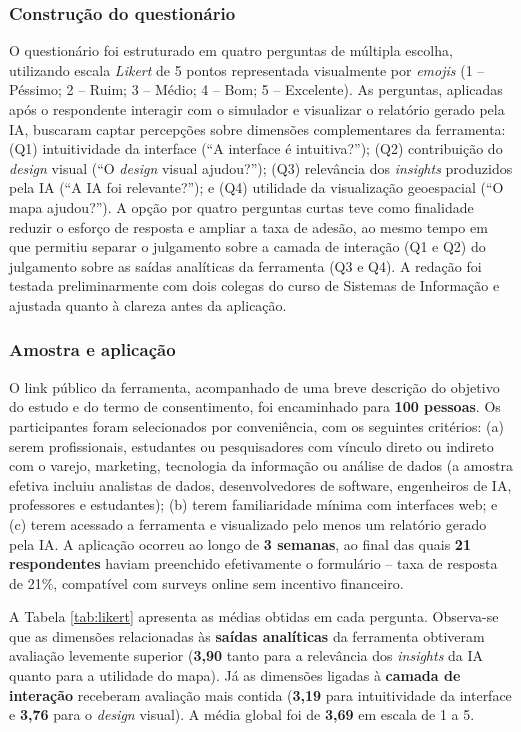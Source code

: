 \subsubsection{\esp Construção do questionário}

O questionário foi estruturado em quatro perguntas de múltipla escolha, utilizando escala \textit{Likert} de 5 pontos representada visualmente por \textit{emojis} (1 -- Péssimo; 2 -- Ruim; 3 -- Médio; 4 -- Bom; 5 -- Excelente). As perguntas, aplicadas após o respondente interagir com o simulador e visualizar o relatório gerado pela IA, buscaram captar percepções sobre dimensões complementares da ferramenta: (Q1) intuitividade da interface (``A interface é intuitiva?''); (Q2) contribuição do \textit{design} visual (``O \textit{design} visual ajudou?''); (Q3) relevância dos \textit{insights} produzidos pela IA (``A IA foi relevante?''); e (Q4) utilidade da visualização geoespacial (``O mapa ajudou?''). A opção por quatro perguntas curtas teve como finalidade reduzir o esforço de resposta e ampliar a taxa de adesão, ao mesmo tempo em que permitiu separar o julgamento sobre a camada de interação (Q1 e Q2) do julgamento sobre as saídas analíticas da ferramenta (Q3 e Q4). A redação foi testada preliminarmente com dois colegas do curso de Sistemas de Informação e ajustada quanto à clareza antes da aplicação.

\subsubsection{\esp Amostra e aplicação}

O link público da ferramenta, acompanhado de uma breve descrição do objetivo do estudo e do termo de consentimento, foi encaminhado para \textbf{100 pessoas}. Os participantes foram selecionados por conveniência, com os seguintes critérios: (a) serem profissionais, estudantes ou pesquisadores com vínculo direto ou indireto com o varejo, marketing, tecnologia da informação ou análise de dados (a amostra efetiva incluiu analistas de dados, desenvolvedores de software, engenheiros de IA, professores e estudantes); (b) terem familiaridade mínima com interfaces web; e (c) terem acessado a ferramenta e visualizado pelo menos um relatório gerado pela IA. A aplicação ocorreu ao longo de \textbf{3 semanas}, ao final das quais \textbf{21 respondentes} haviam preenchido efetivamente o formulário -- taxa de resposta de 21\%, compatível com surveys online sem incentivo financeiro.

A Tabela \ref{tab:likert} apresenta as médias obtidas em cada pergunta. Observa-se que as dimensões relacionadas às \textbf{saídas analíticas} da ferramenta obtiveram avaliação levemente superior (\textbf{3,90} tanto para a relevância dos \textit{insights} da IA quanto para a utilidade do mapa). Já as dimensões ligadas à \textbf{camada de interação} receberam avaliação mais contida (\textbf{3,19} para intuitividade da interface e \textbf{3,76} para o \textit{design} visual). A média global foi de \textbf{3,69} em escala de 1 a 5.

